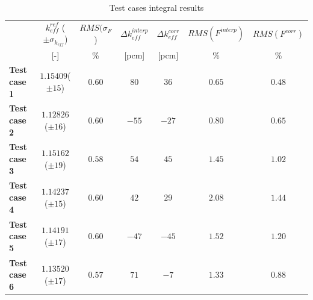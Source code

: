 \documentclass[letterpaper]{physor2026}
\begin{document}
\begin{table}[!ht]
    \centering
    \caption{Test cases integral results}
    \begin{tabular}{lcccccc}
        \toprule
         
         \textbf{}           & 
         { $k_{eff}^{ref}$ ($\pm\sigma_{k_{eff}}$) } &
         { $RMS(\sigma_F$) } & 
         
         {$ \Delta k_{eff}^{interp} $ } & 
         {$\Delta k_{eff}^{corr}$} &   
         {$ RMS(F^{interp}) $ } & 
         {$ RMS(F^{corr})$ } \\ 
         

         \textbf{}           & 
         { [-] } &
         { \% } & 
         
         {[pcm] } & 
         {[pcm]} &   
         { \% } & 
         { \% } \\ 
         \midrule

         \textbf{Test case 1}           & 
         $1.15409$($\pm 15$) &
         $0.60$ &
         $80$ & 
         $36$ &
         $0.65$ &
         $0.48$ \\ 
         \midrule
        
         
         \textbf{Test case 2}           & 
         $1.12826$ ($\pm 16$) &
         $0.60$ &         
         $-55$ & 
         $-27$ &
         $0.80$ &
         $0.65$ \\ 
         \midrule

         \textbf{Test case 3}           & 
         $1.15162$ ($\pm 19$) &
         $0.58$ &         
         $54$ & 
         $45$ &
         $1.45$ &
         $1.02$ \\ 
         \midrule



         
         \textbf{Test case 4}           & 
         $1.14237$ ($\pm 15$) &
         $0.60$ &         
         $42$ & 
         $29$ &
         $2.08$ &
         $1.44$ \\ 
         \midrule

    
         \textbf{Test case 5}           & 
         $1.14191$ ($\pm 17$) &
         $0.60$ &
         $-47$ & 
         $-45$ &
         $1.52$ &
         $1.20$ \\
         \midrule
         
         \textbf{Test case 6}           & 
         $1.13520$ ($\pm 17$) &
         $0.57$ &
         $71$ & 
         $-7$ &
         $1.33$ &
         $0.88$ \\ 


         
         
         \bottomrule
         
    \end{tabular}
    
    \label{tab:table_results_testing_case}
\end{table}
\end{document}
